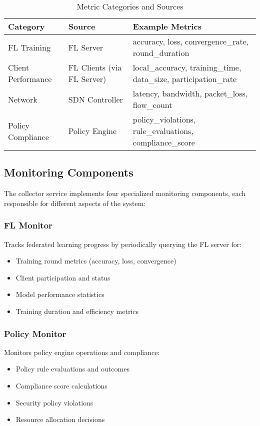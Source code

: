 \begin{table}[H]
\centering
\caption{Metric Categories and Sources}
\label{tab:metric-categories}
\begin{tabular}{@{}llp{5cm}@{}}
\toprule
\textbf{Category} & \textbf{Source} & \textbf{Example Metrics} \\
\midrule
FL Training & FL Server & accuracy, loss, convergence\_rate, round\_duration \\
Client Performance & FL Clients (via FL Server) & local\_accuracy, training\_time, data\_size, participation\_rate \\
Network & SDN Controller & latency, bandwidth, packet\_loss, flow\_count \\
Policy Compliance & Policy Engine & policy\_violations, rule\_evaluations, compliance\_score \\
\bottomrule
\end{tabular}
\end{table}

\subsection{Monitoring Components}

The collector service implements four specialized monitoring components, each responsible for different aspects of the system:

\subsubsection{FL Monitor}
Tracks federated learning progress by periodically querying the FL server for:
\begin{itemize}
    \item Training round metrics (accuracy, loss, convergence)
    \item Client participation and status
    \item Model performance statistics
    \item Training duration and efficiency metrics
\end{itemize}

\subsubsection{Policy Monitor}
Monitors policy engine operations and compliance:
\begin{itemize}
    \item Policy rule evaluations and outcomes
    \item Compliance score calculations
    \item Security policy violations
    \item Resource allocation decisions
\end{itemize}

